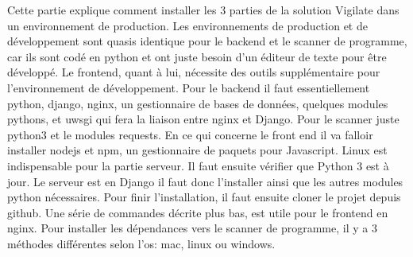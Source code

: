 Cette partie explique comment installer les 3 parties de la solution Vigilate dans un environnement de production. Les environnements de production et de développement sont quasis identique pour le backend et le scanner de programme, car ils sont codé en python et ont juste besoin d’un éditeur de texte pour être développé. Le frontend, quant à lui, nécessite des outils supplémentaire pour l’environnement de développement. Pour le backend il faut essentiellement python, django, nginx, un gestionnaire de bases de données, quelques modules pythons, et uwsgi qui fera la liaison entre nginx et Django. Pour le scanner juste python3 et le modules requests. En ce qui concerne le front end il va falloir installer nodejs et npm, un gestionnaire de paquets pour Javascript.
Linux est indispensable pour la partie serveur. Il faut ensuite vérifier que Python 3 est à jour. Le serveur est en Django il faut donc l’installer ainsi que les autres modules python nécessaires. Pour finir l’installation, il faut ensuite cloner le projet depuis github. Une série de commandes décrite plus bas, est utile pour le frontend en nginx.
Pour installer les dépendances vers le scanner de programme, il y a 3 méthodes différentes selon l’os: mac, linux ou windows.